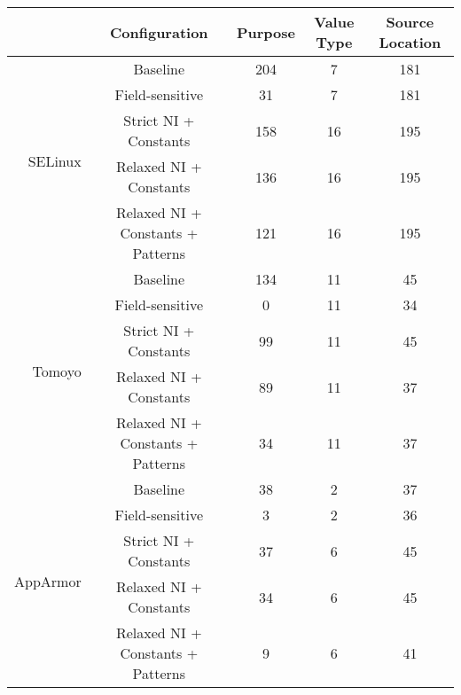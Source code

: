 \begin{table*}
    \centering
    
    \begin{tabular}{|r|c|c|c|c|}
    \hline
    & Configuration & Purpose & Value Type & Source Location\\
    
    \hline
    
    
    \multirow{5}{*}{SELinux}      & Baseline                              &   204 &     7 &   181 \\
                                  & Field-sensitive                       &    31 &     7 &   181 \\ \cline{2-5}
                                  & Strict NI + Constants                 &   158 &    16 &   195 \\
                                  & Relaxed NI + Constants                &   136 &    16 &   195 \\
                                  & Relaxed NI + Constants + Patterns     &   121 &    16 &   195 \\ \hline
    \multirow{5}{*}{Tomoyo}       & Baseline                              &   134 &    11 &    45 \\
                                  & Field-sensitive                       &     0 &    11 &    34 \\ \cline{2-5}
                                  & Strict NI + Constants                 &    99 &    11 &    45 \\
                                  & Relaxed NI + Constants                &    89 &    11 &    37 \\
                                  & Relaxed NI + Constants + Patterns     &    34 &    11 &    37 \\ \hline
    \multirow{5}{*}{AppArmor}     & Baseline                              &    38 &     2 &    37 \\
                                  & Field-sensitive                       &     3 &     2 &    36 \\ \cline{2-5}
                                  & Strict NI + Constants                 &    37 &     6 &    45 \\
                                  & Relaxed NI + Constants                &    34 &     6 &    45 \\
                                  & Relaxed NI + Constants + Patterns     &     9 &     6 &    41 \\ \hline
    

\end{tabular}
\end{table*}
